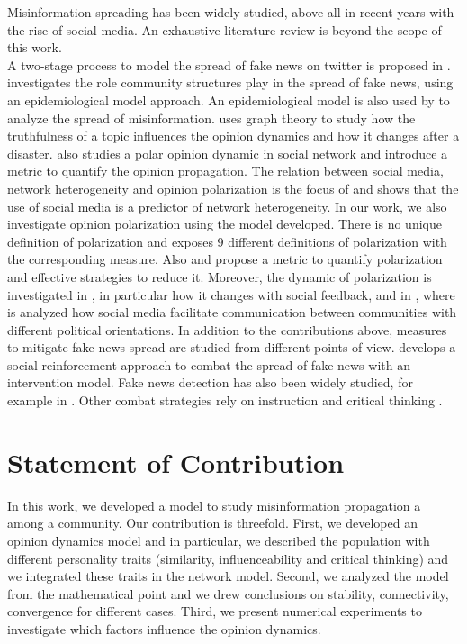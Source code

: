 Misinformation spreading has been widely studied, above all in recent years with the rise of social media. An exhaustive literature review is beyond the scope of this work.\\

A two-stage process to model the spread of fake news on twitter is proposed in \cite{Murayama2021}. \cite{Rath2019} investigates the role community structures play in the spread of fake news, using an epidemiological model approach. An epidemiological model is also used by \cite{Tambuscio2015} to analyze the spread of misinformation. \cite{Hashimoto2021} uses graph theory to study how the truthfulness of a topic influences the opinion dynamics and how it changes after a disaster. \cite{Amelkin2017} also studies a polar opinion dynamic in social network and introduce a metric to quantify the opinion propagation. The relation between social media, network heterogeneity and opinion polarization is the focus of \cite{Lee2014a} and shows that the use of social media is a predictor of network heterogeneity. In our work, we also investigate opinion polarization using the model developed. There is no unique definition of polarization and \cite{Bramsona2016} exposes 9 different definitions of polarization with the corresponding measure. Also \cite{Akoglu2014} and \cite{Matakos2017} propose a metric to quantify polarization and effective strategies to reduce it. Moreover, the dynamic of polarization is investigated in \cite{Banisch2019}, in particular how it changes with social feedback, and in \cite{Conover2011}, where is analyzed how social media facilitate communication between communities with different political orientations. In addition to the contributions above, measures to mitigate fake news spread are studied from different points of view. \cite{mahak2020} develops a social reinforcement approach to combat the spread of fake news with an intervention model. Fake news detection has also been widely studied, for example in \cite{Vijjali2020}\cite{improved}\cite{Zhou2020}\cite{Maryam2019}. Other combat strategies rely on instruction and critical thinking \cite{joanna2017}.


\section{Statement of Contribution}

In this work, we developed a model to study misinformation propagation a among a community. Our contribution is threefold. First, we developed an opinion dynamics model and in particular, we described the population with different personality traits (similarity, influenceability and critical thinking) and we integrated these traits in the network model. Second, we analyzed the model from the mathematical point and we drew conclusions on stability, connectivity, convergence for different cases. Third, we present numerical experiments to investigate which factors influence the opinion dynamics. 



